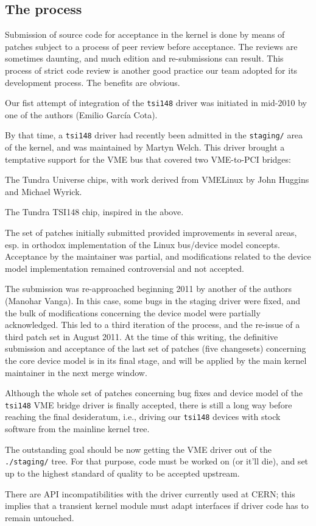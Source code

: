 \documentclass{JAC2003}
\begin{document}
\subsection{The process}

Submission of source code for acceptance in the kernel is done by means
of patches subject to a process of peer review before acceptance. The
reviews are sometimes daunting, and much edition and re-submissions can
result. This process of strict code review is another good practice our
team adopted for its development process. The benefits are obvious.

Our fist attempt of integration of the \verb|tsi148| driver
was initiated in mid-2010 by one of the authors (Emilio Garc\'ia
Cota).

By that time, a \verb|tsi148| driver had recently been admitted in the
\texttt{staging/} area of the kernel, and was maintained by Martyn Welch. This
driver brought a temptative support for the VME bus that covered
two VME-to-PCI bridges:
\begin{Itemize}
\item The Tundra Universe chips, with work derived from VMELinux by John
Huggins and Michael Wyrick.
\item The Tundra TSI148 chip, inspired in the above.
\end{Itemize}

The set of patches initially submitted provided improvements in several
areas, esp. in orthodox implementation of the Linux bus/device model
concepts.
Acceptance by the maintainer was partial, and modifications related to
the device model implementation remained controversial and not accepted.

The submission was re-approached beginning 2011 by another of the
authors (Manohar Vanga). In this case, some bugs in the staging driver
were fixed, and the bulk of modifications concerning the device model
were partially acknowledged. This led to a third iteration of the
process, and the re-issue of a third patch set in August 2011. At the
time of this writing, the definitive submission and acceptance of the
last set of patches (five changesets) concerning the core device model
is in its final stage, and will be applied by the main kernel maintainer
in the next merge window.

Although the whole set of patches concerning bug
fixes and device model of the \verb|tsi148| VME bridge driver is
finally accepted, there is still a long way before reaching
the final desideratum, i.e., driving our \verb|tsi148| devices
with stock software from the mainline kernel tree.
\begin{Itemize}
\item The outstanding goal should be now getting the VME driver out
of the \verb|./staging/| tree. For that purpose, code must be worked on
(or it'll die), and set up to the highest standard of quality to be
accepted upstream.
\item There are API  incompatibilities with the driver currently used at
CERN; this implies that a transient kernel module must adapt interfaces
if driver code has to remain untouched.
\end{Itemize}
\end{document}
